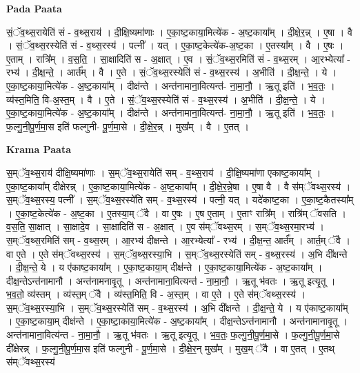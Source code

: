 \documentclass[17pt]{extarticle}
\begin{document}
\textbf{Pada Paata} \newline

सं॒ॅव॒थ्स॒रायेति॑ सं - व॒थ्स॒राय॑ । दी॒क्षि॒ष्यमा॑णाः । ए॒का॒ष्ट॒काया॒मित्ये॑क - अ॒ष्ट॒काया᳚म् । दी॒क्षे॒र॒न्न् । ए॒षा । वै । सं॒ॅव॒थ्स॒रस्येति॑ सं - व॒थ्स॒रस्य॑ । पत्नी᳚ । यत् । ए॒का॒ष्ट॒केत्ये॑क-अ॒ष्ट॒का । ए॒तस्या᳚म् । वै । ए॒षः । ए॒ताम् । रात्रि᳚म् । व॒स॒ति॒ । सा॒क्षादिति॑ स - अ॒क्षात् । ए॒व । सं॒ॅव॒थ्स॒रमिति॑ सं -  व॒थ्स॒रम् । आ॒रभ्येत्या᳚ - रभ्य॑ । दी॒क्ष॒न्ते॒ । आर्त᳚म् । वै । ए॒ते । सं॒ॅव॒थ्स॒रस्येति॑ सं - व॒थ्स॒रस्य॑ । अ॒भीति॑ । दी॒क्ष॒न्ते॒ । ये । ए॒का॒ष्ट॒काया॒मित्ये॑क - अ॒ष्ट॒काया᳚म् । दीक्ष॑न्ते । अन्त॑नामाना॒वित्यन्त॑- ना॒मा॒नौ॒ । ऋ॒तू इति॑ । भ॒व॒तः॒ । व्य॑स्त॒मिति॒ वि-अ॒स्त॒म् । वै । ए॒ते । सं॒ॅव॒थ्स॒रस्येति॑ सं - व॒थ्स॒रस्य॑ । अ॒भीति॑ । दी॒क्ष॒न्ते॒ । ये । ए॒का॒ष्ट॒काया॒मित्ये॑क - अ॒ष्ट॒काया᳚म् । दीक्ष॑न्ते । अन्त॑नामाना॒वित्यन्त॑- ना॒मा॒नौ॒ । ऋ॒तू इति॑ । भ॒व॒तः॒ । फ॒ल्गु॒नी॒पू॒र्ण॒मा॒स इति॑ फल्गुनी- पू॒र्ण॒मा॒से । दी॒क्षे॒र॒न्न् । मुख᳚म् । वै । ए॒तत् ।  \newline


\textbf{Krama Paata} \newline

स॒म्ॅव॒थ्स॒राय॑ दीक्षि॒ष्यमा॑णाः । स॒म्ॅव॒थ्स॒रायेति॑ सम् - व॒थ्स॒राय॑ । दी॒क्षि॒ष्यमा॑णा एकाष्ट॒काया᳚म् । ए॒का॒ष्ट॒काया᳚म् दीक्षेरन्न् । ए॒का॒ष्ट॒काया॒मित्ये॑क - अ॒ष्ट॒काया᳚म् । दी॒क्षे॒र॒न्ने॒षा । ए॒षा वै । वै स॑म्ॅवथ्स॒रस्य॑ । स॒म्ॅव॒थ्स॒रस्य॒ पत्नी᳚ । स॒म्ॅव॒थ्स॒रस्ये॑ति सम् - व॒थ्स॒रस्य॑ । पत्नी॒ यत् । यदे॑काष्ट॒का । ए॒का॒ष्ट॒कैतस्या᳚म् । ए॒का॒ष्ट॒केत्ये॑क - अ॒ष्ट॒का । ए॒तस्या॒म् ॅवै । वा ए॒षः । ए॒ष ए॒ताम् । ए॒ताꣳ रात्रि᳚म् । रात्रि॑म् ॅवसति । व॒स॒ति॒ सा॒क्षात् । सा॒क्षादे॒व । सा॒क्षादिति॑ स - अ॒क्षात् । ए॒व स॑म्ॅवथ्स॒रम् । स॒म्ॅव॒थ्स॒रमा॒रभ्य॑ । स॒म्ॅव॒थ्स॒रमिति॑ सम् - व॒थ्स॒रम् । आ॒रभ्य॑ दीक्षन्ते । आ॒रभ्येत्या᳚ - रभ्य॑ । दी॒क्ष॒न्त॒ आर्त᳚म् । आर्त॒म् ॅवै । वा ए॒ते । ए॒ते स॑म्ॅवथ्स॒रस्य॑ । स॒म्ॅव॒थ्स॒रस्या॒भि । स॒म्ॅव॒थ्स॒रस्येति॑ सम् - व॒थ्स॒रस्य॑ । अ॒भि दी᳚क्षन्ते । दी॒क्ष॒न्ते॒ ये । य ए॑काष्ट॒काया᳚म् । ए॒का॒ष्ट॒काया॒म् दीक्ष॑न्ते । ए॒का॒ष्ट॒काया॒मित्ये॑क - अ॒ष्ट॒काया᳚म् । दीक्ष॒न्तेऽन्त॑नामानौ । अन्त॑नामनावृ॒तू । अन्त॑नामाना॒वित्यन्त॑ - ना॒मा॒नौ॒ । ऋ॒तू भ॑वतः । ऋ॒तू इत्यृ॒तू । भ॒व॒तो॒ व्य॑स्तम् । व्य॑स्त॒म् ॅवै । व्य॑स्त॒मिति॒ वि - अ॒स्त॒म् । वा ए॒ते । ए॒ते स॑म्ॅवथ्स॒रस्य॑ । स॒म्ॅव॒थ्स॒रस्या॒भि । स॒म्ॅव॒थ्स॒रस्येति॑ सम् - व॒थ्स॒रस्य॑ । अ॒भि दी᳚क्षन्ते । दी॒क्ष॒न्ते॒ ये । य ए॑काष्ट॒काया᳚म् । ए॒का॒ष्ट॒काया॒म् दीक्ष॑न्ते । ए॒का॒ष्टा॒काया॒मित्ये॑क - अ॒ष्ट॒काया᳚म् । दीक्ष॒न्तेऽन्त॑नामानौ । अन्त॑नामानावृ॒तू । अन्त॑नामाना॒वित्य॑न्त - ना॒मा॒नौ॒ । ऋ॒तू भ॑वतः । ऋ॒तू इत्यृ॒तू । भ॒व॒तः॒ फ॒ल्गु॒नी॒पू॒र्ण॒मा॒से । फ॒ल्गु॒नी॒पू॒र्ण॒मा॒से दी᳚क्षेरन्न् । फ॒ल्गु॒नी॒पू॒र्ण॒मा॒स इति॑ फल्गुनी - पू॒र्ण॒मा॒से । दी॒क्षे॒र॒न् मुख᳚म् । मुख॒म् ॅवै । वा ए॒तत् । ए॒तथ् स॑म्ॅवथ्स॒रस्य॑ \newline
\end{document}
